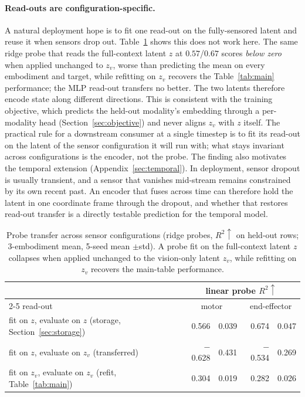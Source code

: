 \documentclass{article}
\begin{document}
\paragraph{Read-outs are configuration-specific.} A natural deployment hope is to fit one read-out on the fully-sensored latent and reuse it when sensors drop out. Table~\ref{tab:transfer} shows this does not work here. The same ridge probe that reads the full-context latent $z$ at $0.57$/$0.67$ scores \emph{below zero} when applied unchanged to $z_v$, worse than predicting the mean on every embodiment and target, while refitting on $z_v$ recovers the Table~\ref{tab:main} performance; the MLP read-out transfers no better. The two latents therefore encode state along different directions. This is consistent with the training objective, which predicts the held-out modality's embedding through a per-modality head (Section~\ref{sec:objective}) and never aligns $z_v$ with $z$ itself. The practical rule for a downstream consumer at a single timestep is to fit its read-out on the latent of the sensor configuration it will run with; what stays invariant across configurations is the encoder, not the probe. The finding also motivates the temporal extension (Appendix~\ref{sec:temporal}). In deployment, sensor dropout is usually transient, and a sensor that vanishes mid-stream remains constrained by its own recent past. An encoder that fuses across time can therefore hold the latent in one coordinate frame through the dropout, and whether that restores read-out transfer is a directly testable prediction for the temporal model.

\begin{table}[!b]
  \centering
  \small
  \caption{Probe transfer across sensor configurations (ridge probes, $R^2\uparrow$ on held-out rows; 3-embodiment mean, 5-seed mean $\pm$std). A probe fit on the full-context latent $z$ collapses when applied unchanged to the vision-only latent $z_v$, while refitting on $z_v$ recovers the main-table performance.}
  \label{tab:transfer}
  \begin{tabular}{lr@{\,$\pm$\,}lr@{\,$\pm$\,}l}
    \toprule
    & \multicolumn{4}{c}{linear probe $R^2\uparrow$} \\
    \cmidrule(lr){2-5}
    read-out & \multicolumn{2}{c}{motor} & \multicolumn{2}{c}{end-effector} \\
    \midrule
    fit on $z$, evaluate on $z$ (storage, Section~\ref{sec:storage}) & 0.566 & 0.039 & 0.674 & 0.047 \\
    fit on $z$, evaluate on $z_v$ (transferred)               & $-$0.628 & 0.431 & $-$0.534 & 0.269 \\
    fit on $z_v$, evaluate on $z_v$ (refit, Table~\ref{tab:main}) & 0.304 & 0.019 & 0.282 & 0.026 \\
    \bottomrule
  \end{tabular}
\end{table}
\end{document}
